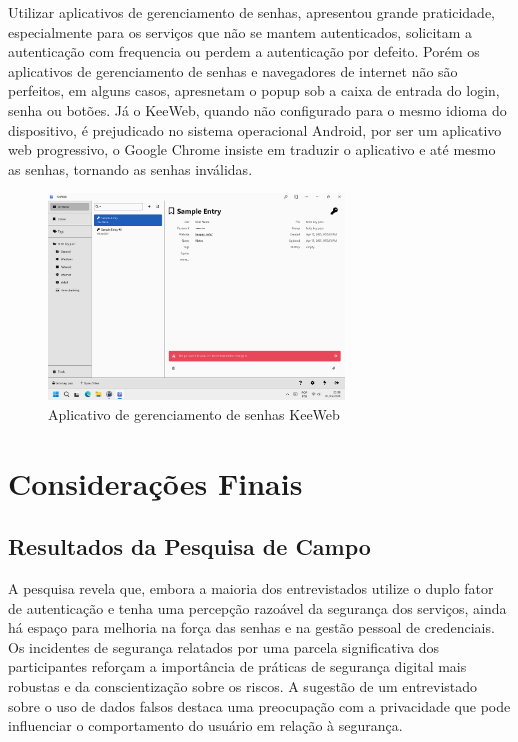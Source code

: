 \documentclass[12pt]{article}
\begin{document}
Utilizar aplicativos de gerenciamento de senhas, apresentou grande praticidade,
especialmente para os serviços que não se mantem autenticados, solicitam a
autenticação com frequencia ou perdem a autenticação por defeito.
Porém os aplicativos de gerenciamento de senhas e navegadores de internet não
são perfeitos, em alguns casos, apresnetam o popup sob a caixa de entrada do
login, senha ou botões.
Já o KeeWeb, quando não configurado para o mesmo idioma do dispositivo, é
prejudicado no sistema operacional Android, por ser um aplicativo web progressivo,
o Google Chrome insiste em traduzir o aplicativo e até mesmo as senhas, tornando
as senhas inválidas.

\begin{figure}[h!]
  \centering
  \includegraphics[width=0.7\textwidth]{./assets/keeweb.png}
  \caption{Aplicativo de gerenciamento de senhas KeeWeb}
  \label{fig:KeeWeb}
\end{figure}

\section{Considerações Finais}

\subsection{Resultados da Pesquisa de Campo}

A pesquisa revela que, embora a maioria dos entrevistados utilize o duplo fator de
autenticação e tenha uma percepção razoável da segurança dos serviços, ainda há
espaço para melhoria na força das senhas e na gestão pessoal de credenciais.
Os incidentes de segurança relatados por uma parcela significativa dos participantes
reforçam a importância de práticas de segurança digital mais robustas e da
conscientização sobre os riscos.
A sugestão de um entrevistado sobre o uso de dados falsos destaca uma preocupação
com a privacidade que pode influenciar o comportamento do usuário em relação à
segurança.
\end{document}
